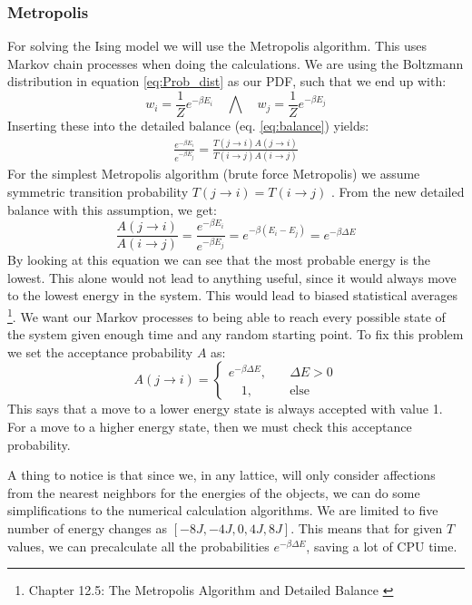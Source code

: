 \documentclass[12pt,a4paper,english]{article}
\begin{document}
\subsubsection{Metropolis}
\label{subsubsect:Metro}
For solving the Ising model we will use the Metropolis algorithm. This uses Markov chain processes when doing the calculations. We are using the Boltzmann distribution in equation \ref{eq:Prob_dist} as our PDF, such that we end up with:
\[w_i=\frac{1}{Z}e^{-\beta E_i}\quad \bigwedge\quad w_j=\frac{1}{Z}e^{-\beta E_j}\]
Inserting these into the detailed balance (eq. \ref{eq:balance}) yields:
\begin{align*}
\frac{e^{-\beta E_i}}{e^{-\beta E_j}}=\frac{T(j\rightarrow i)A(j\rightarrow i)}{T(i\rightarrow j)A(i\rightarrow j)}
\end{align*}
For the simplest Metropolis algorithm (brute force Metropolis) we assume symmetric transition probability $T(j\rightarrow i)=T(i\rightarrow j)$ \cite{ComPhys}. From the new detailed balance with this assumption, we get:
\begin{equation}
\label{eq:Brute_Metro}
\frac{A(j\rightarrow i)}{A(i\rightarrow j)}=\frac{e^{-\beta E_i}}{e^{-\beta E_j}}=e^{-\beta(E_i-E_j)}=e^{-\beta\Delta E}
\end{equation}
By looking at this equation we can see that the most probable energy is the lowest. This alone would not lead to anything useful, since it would always move to the lowest energy in the system. This would lead to biased statistical averages \footnote{Chapter 12.5: The Metropolis Algorithm and Detailed Balance \cite{ComPhys}}. We want our Markov processes to being able to reach every possible state of the system given enough time and any random starting point. To fix this problem we set the acceptance probability $A$ as:
\[A(j\rightarrow i)=\begin{cases} e^{-\beta \Delta E},\quad &\Delta E>0\\
\quad 1,\quad &\text{else}
\end{cases}\]
This says that a move to a lower energy state is always accepted with value 1. For a move to a higher energy state, then we must check this acceptance probability. 

A thing to notice is that since we, in any lattice, will only consider affections from the nearest neighbors for the energies of the objects, we can do some simplifications to the numerical calculation algorithms. We are limited to five number of energy changes as $[-8J,-4J, 0, 4J, 8J]$. This means that for given $T$ values, we can precalculate all the probabilities $e^{-\beta \Delta E}$, saving a lot of CPU time.
\end{document}

